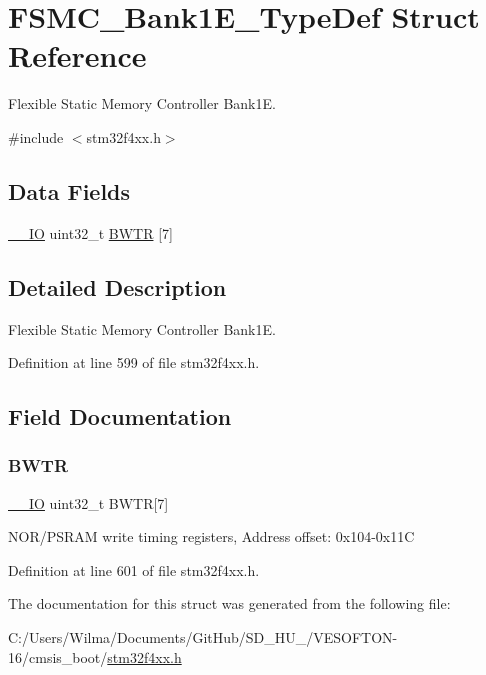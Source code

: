 \hypertarget{struct_f_s_m_c___bank1_e___type_def}{}\section{F\+S\+M\+C\+\_\+\+Bank1\+E\+\_\+\+Type\+Def Struct Reference}
\label{struct_f_s_m_c___bank1_e___type_def}


Flexible Static Memory Controller Bank1E.  




{\ttfamily \#include $<$stm32f4xx.\+h$>$}

\subsection*{Data Fields}
\begin{DoxyCompactItemize}
\item 
\hyperlink{group___c_m_s_i_s__core__definitions_gaec43007d9998a0a0e01faede4133d6be}{\+\_\+\+\_\+\+IO} uint32\+\_\+t \hyperlink{struct_f_s_m_c___bank1_e___type_def_a20f13b79c0f8670af319af0c5ebd5c91}{B\+W\+TR} \mbox{[}7\mbox{]}
\end{DoxyCompactItemize}


\subsection{Detailed Description}
Flexible Static Memory Controller Bank1E. 

Definition at line 599 of file stm32f4xx.\+h.



\subsection{Field Documentation}
\mbox{\label{struct_f_s_m_c___bank1_e___type_def_a20f13b79c0f8670af319af0c5ebd5c91}} 
\subsubsection{\texorpdfstring{B\+W\+TR}{BWTR}}
{\footnotesize\ttfamily \hyperlink{group___c_m_s_i_s__core__definitions_gaec43007d9998a0a0e01faede4133d6be}{\+\_\+\+\_\+\+IO} uint32\+\_\+t B\+W\+TR\mbox{[}7\mbox{]}}

N\+O\+R/\+P\+S\+R\+AM write timing registers, Address offset\+: 0x104-\/0x11C 

Definition at line 601 of file stm32f4xx.\+h.



The documentation for this struct was generated from the following file\+:\begin{DoxyCompactItemize}
\item 
C\+:/\+Users/\+Wilma/\+Documents/\+Git\+Hub/\+S\+D\+\_\+\+H\+U\+\_/\+V\+E\+S\+O\+F\+T\+O\+N-\/16/cmsis\+\_\+boot/\hyperlink{stm32f4xx_8h}{stm32f4xx.\+h}\end{DoxyCompactItemize}
